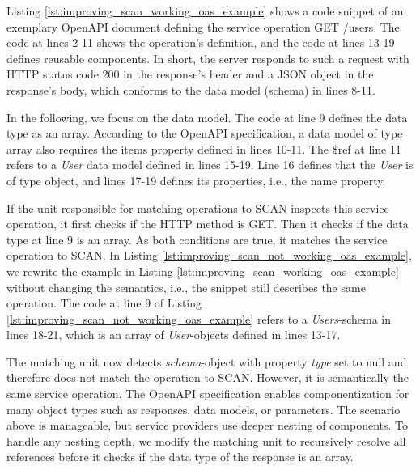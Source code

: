 Listing \ref{lst:improving_scan_working_oas_example} shows a code snippet of an exemplary OpenAPI document defining the service operation GET /users. 
The code at lines 2-11 shows the operation's definition, and the code at lines 13-19 defines reusable components. In short, the server responds to such a request with HTTP status code 200 in the response's header and a JSON object in the response's body, which conforms to the data model (schema) in lines 8-11.

In the following, we focus on the data model. The code at line 9 defines the data type as an array. According to the OpenAPI specification, a data model of type array also requires the items property defined in lines 10-11. The \$ref at line 11 refers to a \textit{User} data model defined in lines 15-19. Line 16 defines that the  \textit{User} is of type object, and lines 17-19 defines its properties, i.e., the name property.





If the unit responsible for matching operations to SCAN inspects this service operation, it first checks if the HTTP method is GET. Then it checks if the data type at line 9 is an array. As both conditions are true, it matches the service operation to SCAN. 
In Listing \ref{lst:improving_scan_not_working_oas_example}, we rewrite the example in Listing \ref{lst:improving_scan_working_oas_example} without changing the semantics, i.e., the snippet still describes the same operation.  
The code at line 9 of Listing  \ref{lst:improving_scan_not_working_oas_example} refers to a \textit{Users}-schema in lines 18-21, which is an array of \textit{User}-objects defined in lines 13-17.

The matching unit now detects \textit{schema}-object with property \textit{type} set to null and therefore does not match the operation to SCAN. However, it is semantically the same service operation.
The OpenAPI specification enables componentization for many object types such as responses, data models, or parameters. The scenario above is manageable, but service providers use deeper nesting of components. To handle any nesting depth, we modify the matching unit to recursively resolve all references before it checks if the data type of the response is an array.   